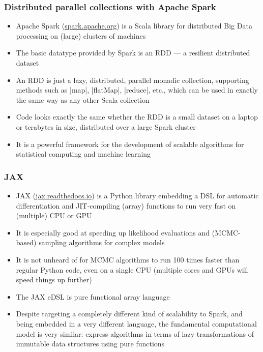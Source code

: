 \documentclass[mathserif,handout]{beamer}
\begin{document}
\begin{frame}[fragile]
  \frametitle{Distributed parallel collections with Apache Spark}
  \begin{itemize}
  \item \alert{Apache Spark} (\url{spark.apache.org}) is a Scala library for distributed Big Data processing on (large) clusters of machines
  \item The basic datatype provided by Spark is an \alert{RDD} --- a resilient distributed dataset
  \item An RDD is just a \alert{lazy}, \alert{distributed}, parallel monadic collection, supporting methods such as |map|, |flatMap|, |reduce|, etc., which can be used in exactly the same way as any other Scala collection
  \item Code looks exactly the same whether the RDD is a small dataset on a laptop or terabytes in size, distributed over a large Spark cluster
    \item It is a powerful framework for the development of scalable algorithms for statistical computing and machine learning
  \end{itemize}
\end{frame}

\begin{frame}
  \frametitle{JAX}
  \begin{itemize}
  \item \alert{JAX} (\url{jax.readthedocs.io}) is a Python library embedding a DSL for automatic differentiation and JIT-compiling (array) functions to run very fast on (multiple) CPU or GPU
  \item It is especially good at speeding up likelihood evaluations and (MCMC-based) sampling algorithms for complex models
  \item It is not unheard of for MCMC algorithms to run 100 times faster than regular Python code, even on a single CPU (multiple cores and GPUs will speed things up further)
  \item The JAX eDSL is \alert{pure functional array language}
    \item Despite targeting a completely different kind of scalability to Spark, and being embedded in a very different language, the fundamental computational model is very similar: \alert{express algorithms in terms of lazy transformations of immutable data structures using pure functions}
  \end{itemize}  
\end{frame}
\end{document}

